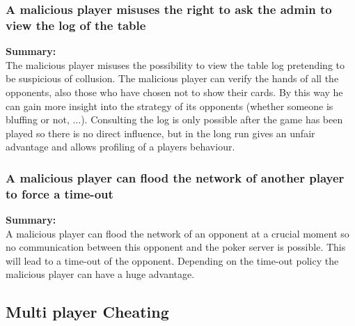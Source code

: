 \documentclass[a4paper,11pt]{report}
\begin{document}
\subsubsection{A malicious player misuses the right to ask the admin to view the log of the table}
\textbf{Summary:} \\
The malicious player misuses the possibility to view the table log pretending to be suspicious of collusion. The malicious player can verify the hands of all the opponents, also those who have chosen not to show their cards. By this way he can gain more insight into the strategy of its opponents (whether someone is bluffing or not, ...). Consulting the log is only possible after the game has been played so there is no direct influence, but in the long run gives an unfair advantage and allows profiling of a players behaviour.

\subsubsection{A malicious player can flood the network of another player to force a time-out}
\textbf{Summary:} \\
A malicious player can flood the network of an opponent at a crucial moment so no communication between this opponent and the poker server is possible. This will lead to a time-out of the opponent. Depending on the time-out policy the malicious player can have a huge advantage.

\subsection{Multi player Cheating}
\end{document}
